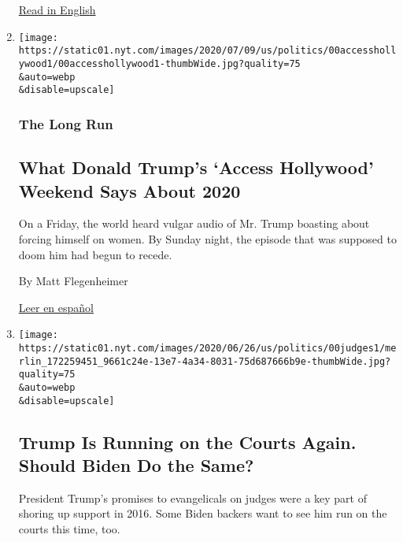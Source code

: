 \begin{enumerate}
  \href{https://www.nytimes.com/2020/07/12/us/politics/donald-trump-access-hollywood.html}{Read
  in English}
\item
  \href{/2020/07/12/us/politics/donald-trump-access-hollywood.html}{}

  \texttt{[image: https://static01.nyt.com/images/2020/07/09/us/politics/00accesshollywood1/00accesshollywood1-thumbWide.jpg?quality=75\\\&auto=webp\\\&disable=upscale]}

  \hypertarget{the-long-run}{%
  \subsubsection{The Long Run}\label{the-long-run}}

  \hypertarget{what-donald-trumps-access-hollywood-weekend-says-about-2020}{%
  \subsection{What Donald Trump's `Access Hollywood' Weekend Says About
  2020}\label{what-donald-trumps-access-hollywood-weekend-says-about-2020}}

  On a Friday, the world heard vulgar audio of Mr. Trump boasting about
  forcing himself on women. By Sunday night, the episode that was
  supposed to doom him had begun to recede.

  By Matt Flegenheimer

  \href{https://www.nytimes.com/es/2020/07/14/espanol/estados-unidos/Donald-trump-eleciones-video-hollywood.html}{Leer
  en español}
\item
  \href{/2020/06/29/us/politics/supreme-court-trump-biden.html}{}

  \texttt{[image: https://static01.nyt.com/images/2020/06/26/us/politics/00judges1/merlin\_172259451\_9661c24e-13e7-4a34-8031-75d687666b9e-thumbWide.jpg?quality=75\\\&auto=webp\\\&disable=upscale]}

  \hypertarget{trump-is-running-on-the-courts-again-should-biden-do-the-same}{%
  \subsection{Trump Is Running on the Courts Again. Should Biden Do the
  Same?}\label{trump-is-running-on-the-courts-again-should-biden-do-the-same}}

  President Trump's promises to evangelicals on judges were a key part
  of shoring up support in 2016. Some Biden backers want to see him run
  on the courts this time, too.


\end{enumerate}
